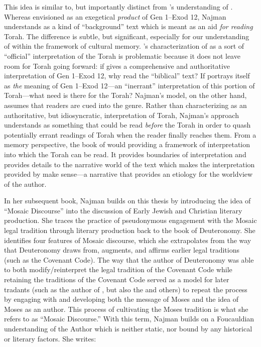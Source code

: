 This idea is similar to, but importantly distinct from \vanderkam's understanding of \jub. Whereas \vanderkam envisioned \jub as an exegetical \emph{product} of Gen 1--Exod 12, Najman understands \jub as a kind of ``background'' text which is meant as an aid \emph{for reading} Torah. The difference is subtle, but significant, especially for our understanding of \jub within the framework of cultural memory. \vanderkam's characterization of \jub as a sort of ``official'' interpretation of the Torah is problematic because it does not leave room for Torah going forward: if \jub gives a comprehensive and authoritative interpretation of Gen 1--Exod 12, why read the ``biblical'' text? If \jub portrays itself as \emph{the} meaning of Gen 1--Exod 12---an ``inerrant'' interpretation of this portion of Torah---what need is there for the Torah? Najman's model, on the other hand, assumes that readers are cued into the genre. Rather than  characterizing \jub as an authoritative, but idiosyncratic, interpretation of Torah, Najman's approach understands \jub as something that could be read \emph{before} the Torah in order to quash potentially errant readings of Torah when the reader finally reaches them.%
    \autocite[408]{najman_jsj1999} 
From a memory perspective, %
the book of \jub would providing a framework of interpretation into which the Torah can be read. It provides boundaries of interpretation and provides details to the narrative world of the text which makes the interpretation provided by \jub make sense---a narrative that provides an etiology for the worldview of the author. 

In her subsequent book, Najman builds on this%
%
thesis by introducing the idea of ``Mosaic Discourse'' into the discussion of Early Jewish and Christian literary production. She traces the practice of pseudonymous engagement with the Mosaic legal tradition through literary production back to the book of Deuteronomy.\autocite[48]{najman2003} She identifies four features of Mosaic discourse, which she extrapolates from the way that Deuteronomy draws from, augments, and affirms earlier legal traditions (such as the Covenant Code). The way that the author of Deuteronomy was able to both modify/reinterpret the legal tradition of the Covenant Code while retaining the traditions of the Covenant Code served as a model for later tradants (such as the author of \jub, but also the \templescroll and others) to repeat the process by engaging with and developing both the message of Moses and the idea of Moses as an author. This process of cultivating the Moses tradition is what she refers to as ``Mosaic Discourse.'' With this term, Najman builds on a Foucauldian understanding of the Author which is neither static, nor bound by any historical or literary factors. She writes:

